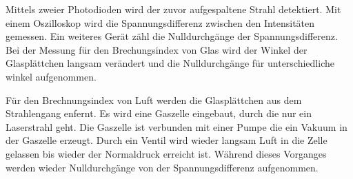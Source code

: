 Mittels zweier Photodioden wird der zuvor aufgespaltene Strahl detektiert.
Mit einem Oszilloskop wird die Spannungsdifferenz zwischen den Intensitäten
gemessen. Ein weiteres Gerät zähl die Nulldurchgänge der Spannungsdifferenz.
Bei der Messung für den Brechungsindex von Glas wird
der Winkel der Glasplättchen langsam verändert und die Nulldurchgänge für unterschiedliche
winkel aufgenommen.

Für den Brechnungsindex von Luft werden die Glasplättchen
aus dem Strahlengang enfernt. Es wird eine Gaszelle eingebaut, durch
die nur ein Laserstrahl geht. Die Gaszelle ist verbunden mit einer Pumpe
die ein Vakuum in der Gaszelle erzeugt. Durch ein Ventil wird wieder langsam
Luft in die Zelle gelassen bis wieder der Normaldruck erreicht ist. Während
dieses Vorganges werden wieder Nulldurchgänge von der Spannungsdifferenz aufgenommen.
